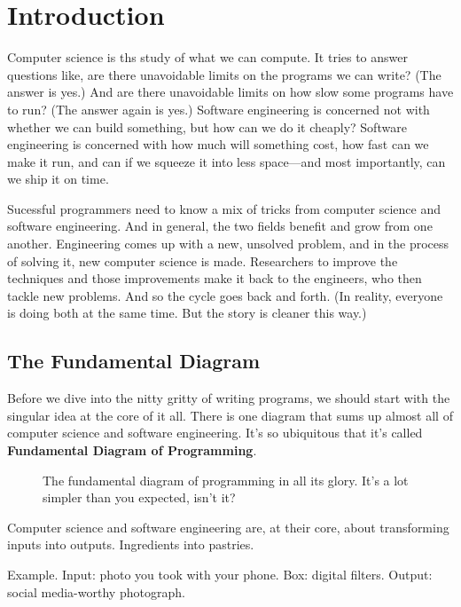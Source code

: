 \setchapterpreamble[u]{\margintoc}
\chapter{Introduction}

Computer science is ths study of what we can compute. It tries to answer questions like, are there unavoidable limits on the programs we can write? (The answer is yes.) And are there unavoidable limits on how slow some programs have to run? (The answer again is yes.) Software engineering is concerned not with whether we can build something, but how can we do it cheaply? Software engineering is concerned with how much will something cost, how fast can we make it run, and can if we squeeze it into less space---and most importantly, can we ship it on time.

Sucessful programmers need to know a mix of tricks from computer science and software engineering. And in general, the two fields benefit and grow from one another. Engineering comes up with a new, unsolved problem, and in the process of solving it, new computer science is made. Researchers to improve the techniques and those improvements make it back to the engineers, who then tackle new problems. And so the cycle goes back and forth. (In reality, everyone is doing both at the same time. But the story is cleaner this way.)

\section{The Fundamental Diagram}
Before we dive into the nitty gritty of writing programs, we should start with the singular idea at the core of it all. There is one diagram that sums up almost all of computer science and software engineering. It's so ubiquitous that it's called \textbf{Fundamental Diagram of Programming}.

\begin{figure}[h]
  
  \caption{The fundamental diagram of programming in all its glory. It's a lot simpler than you expected, isn't it?}
\end{figure}

Computer science and software engineering are, at their core, about transforming inputs into outputs. Ingredients into pastries.

Example. Input: photo you took with your phone. Box: digital filters. Output: social media-worthy photograph.

